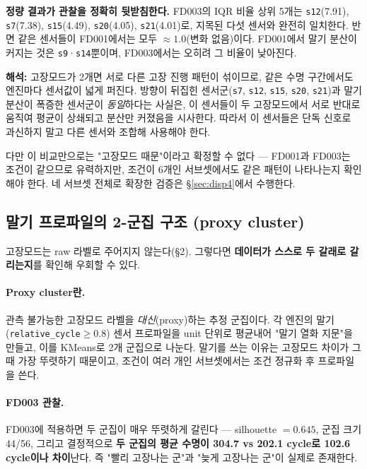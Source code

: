 \documentclass[11pt]{article}
\begin{document}
\textbf{정량 결과가 관찰을 정확히 뒷받침한다.}
FD003의 IQR 비율 상위 5개는 \texttt{s12}(7.91), \texttt{s7}(7.38), \texttt{s15}(4.49), \texttt{s20}(4.05), \texttt{s21}(4.01)로, 지목된 다섯 센서와 완전히 일치한다.
반면 같은 센서들이 FD001에서는 모두 $\approx1.0$(변화 없음)이다.
FD001에서 말기 분산이 커지는 것은 \texttt{s9}·\texttt{s14}뿐이며, FD003에서는 오히려 그 비율이 낮아진다.

\textbf{해석:} 고장모드가 2개면 서로 다른 고장 진행 패턴이 섞이므로, 같은 수명 구간에서도 엔진마다 센서값이 넓게 퍼진다.
방향이 뒤집힌 센서군(\texttt{s7}, \texttt{s12}, \texttt{s15}, \texttt{s20}, \texttt{s21})과 말기 분산이 폭증한 센서군이 \emph{동일}하다는 사실은, 이 센서들이 두 고장모드에서 서로 반대로 움직여 평균이 상쇄되고 분산만 커졌음을 시사한다.
따라서 이 센서들은 단독 신호로 과신하지 말고 다른 센서와 조합해 사용해야 한다.

다만 이 비교만으로는 "고장모드 때문"이라고 확정할 수 없다 — FD001과 FD003는 조건이 같으므로 유력하지만, 조건이 6개인 서브셋에서도 같은 패턴이 나타나는지 확인해야 한다.
네 서브셋 전체로 확장한 검증은 \S\ref{sec:disp4}에서 수행한다.

\subsection{말기 프로파일의 2-군집 구조 (proxy cluster)}

고장모드는 raw 라벨로 주어지지 않는다(\S2). 그렇다면 \textbf{데이터가 스스로 두 갈래로 갈리는지}를 확인해 우회할 수 있다.

\paragraph{Proxy cluster란.}
관측 불가능한 고장모드 라벨을 \emph{대신}(proxy)하는 추정 군집이다.
각 엔진의 말기(\texttt{relative\_cycle}$\ge0.8$) 센서 프로파일을 unit 단위로 평균내어 "말기 열화 지문"을 만들고, 이를 KMeans로 2개 군집으로 나눈다.
말기를 쓰는 이유는 고장모드 차이가 그때 가장 뚜렷하기 때문이고, 조건이 여러 개인 서브셋에서는 조건 정규화 후 프로파일을 쓴다.

\paragraph{FD003 관찰.}
FD003에 적용하면 두 군집이 매우 뚜렷하게 갈린다 — silhouette $=0.645$, 군집 크기 44/56, 그리고 결정적으로 \textbf{두 군집의 평균 수명이 304.7 vs 202.1 cycle로 102.6 cycle이나 차이}난다.
즉 "빨리 고장나는 군"과 "늦게 고장나는 군"이 실제로 존재한다.
\end{document}
